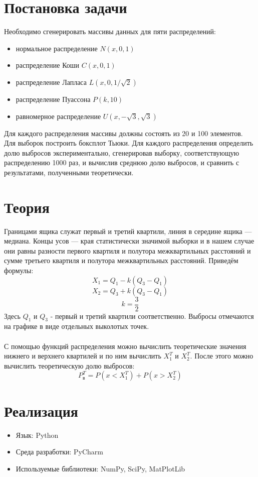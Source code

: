 \section{Постановка задачи}
Необходимо сгенерировать массивы данных для пяти распределений:
\begin{itemize}
\item нормальное распределение \( N(x, 0, 1) \)
\item распределение Коши \( C(x, 0, 1) \)
\item распределение Лапласа \( L(x, 0, 1/\sqrt{2}) \)
\item распределение Пуассона \( P(k, 10) \)
\item равномерное распределение \( U(x, -\sqrt{3}, \sqrt{3}) \)
\end{itemize}
Для каждого распределения массивы должны состоять из 20 и 100 элементов. Для выборок построить боксплот Тьюки. Для каждого распределения определить долю выбросов экспериментально, сгенерировав выборку, соответствующую распределению 1000 раз, и вычислив среднюю долю выбросов, и сравнить с результатами, полученными теоретически.


\section{Теория}
Границами ящика служат первый и третий квартили, линия в середине ящика — медиана. Концы усов — края статистически значимой выборки и в нашем случае они равны разности первого квартиля и полутора межквартильных расстояний и сумме третьего квартиля и полутора межквартильных расстояний. Приведём формулы:
\[X_1 = Q_1 - k(Q_3 - Q_1)\] \[X_2 = Q_3 + k(Q_3 - Q_1)\] \[k = \frac{3}{2}\]
Здесь \(Q_1\) и \(Q_3\) - первый и третий квартили соответственно.
Выбросы отмечаются на графике в виде отдельных выколотых точек.
\\
\\
С помощью функций распределения можно вычислить теоретические значения нижнего и верхнего квартилей и по ним вычислить \(X_1^{T}\) и \(X_2^{T}\). После этого можно вычислить теоретическую долю выбросов:
\[P_в^{T} = P(x < X_1^{T}) + P(x > X_2^{T}) \]



\section{Реализация}
\begin{itemize}
\item Язык: Python
\item Среда разработки: PyCharm
\item Используемые библиотеки: NumPy, SciPy, MatPlotLib
\end{itemize}


